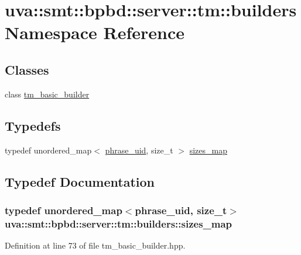 \hypertarget{namespaceuva_1_1smt_1_1bpbd_1_1server_1_1tm_1_1builders}{}\section{uva\+:\+:smt\+:\+:bpbd\+:\+:server\+:\+:tm\+:\+:builders Namespace Reference}
\label{namespaceuva_1_1smt_1_1bpbd_1_1server_1_1tm_1_1builders}
\subsection*{Classes}
\begin{DoxyCompactItemize}
\item 
class \hyperlink{classuva_1_1smt_1_1bpbd_1_1server_1_1tm_1_1builders_1_1tm__basic__builder}{tm\+\_\+basic\+\_\+builder}
\end{DoxyCompactItemize}
\subsection*{Typedefs}
\begin{DoxyCompactItemize}
\item 
typedef unordered\+\_\+map$<$ \hyperlink{namespaceuva_1_1smt_1_1bpbd_1_1server_ad18d4cdf5504e76c22b0c124ff60b44f}{phrase\+\_\+uid}, size\+\_\+t $>$ \hyperlink{namespaceuva_1_1smt_1_1bpbd_1_1server_1_1tm_1_1builders_a25d202b358b0a5c662f1b32b89556bc7}{sizes\+\_\+map}
\end{DoxyCompactItemize}


\subsection{Typedef Documentation}
\hypertarget{namespaceuva_1_1smt_1_1bpbd_1_1server_1_1tm_1_1builders_a25d202b358b0a5c662f1b32b89556bc7}{}
\subsubsection[{sizes\+\_\+map}]{\setlength{\rightskip}{0pt plus 5cm}typedef unordered\+\_\+map$<${\bf phrase\+\_\+uid}, size\+\_\+t$>$ {\bf uva\+::smt\+::bpbd\+::server\+::tm\+::builders\+::sizes\+\_\+map}}\label{namespaceuva_1_1smt_1_1bpbd_1_1server_1_1tm_1_1builders_a25d202b358b0a5c662f1b32b89556bc7}


Definition at line 73 of file tm\+\_\+basic\+\_\+builder.\+hpp.

